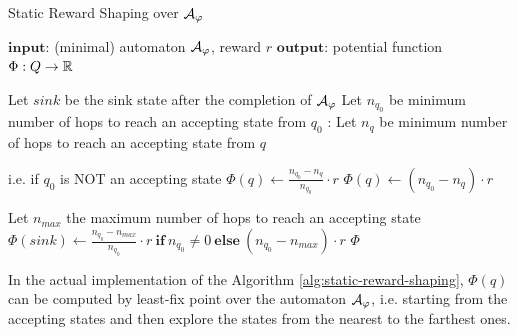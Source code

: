 \begin{algorithm}
	\caption{Static Reward Shaping over $\mathcal{A}_{\varphi}$}
	\label{alg:static-reward-shaping}
	\begin{algorithmic}[1]
		\State $\mathbf{input}$: (minimal) automaton $\mathcal{A}_\varphi$, reward $r$
		\State $\mathbf{output}$: potential function $\Phi: Q\to \mathbb{R}$
		
		\State Let $sink$ be the sink state after the completion of $\mathcal{A}_{\varphi}$
		\State Let $n_{q_0}$ be minimum number of hops to reach an accepting state from $q_0$ \label{alg-line:q0-distance}
		:
			\State Let $n_q$ be minimum number of hops to reach an accepting state from $q$ \label{alg-line:q-distance}
			
			 \Comment i.e. if $q_0$ is NOT an accepting state
				\State $\Phi(q) \gets \frac{n_{q_0} - n_q}{n_{q_0}} \cdot r$
			\Else	
				\State $\Phi(q) \gets (n_{q_0} - n_q) \cdot r$
			\EndIf

		\EndFor
		
		\State Let $n_{max}$ the maximum number of hops  to reach an accepting state \label{alg-line:max-distance}
		\State $\Phi(sink) \gets \frac{n_{q_0} - n_{max}}{n_{q_0}} \cdot r \ \mathbf{if}\  n_{q_0}\neq 0 \ \mathbf{else}\  (n_{q_0} - n_{max}) \cdot r$ 
		\State \Return $\Phi$
 	\end{algorithmic}

\end{algorithm}

In the actual implementation of the Algorithm \ref{alg:static-reward-shaping}, $\Phi(q)$ can be computed  by least-fix point over the automaton $\mathcal{A}_\varphi$, i.e. starting from the accepting states and then explore the states from the nearest to the farthest ones.

